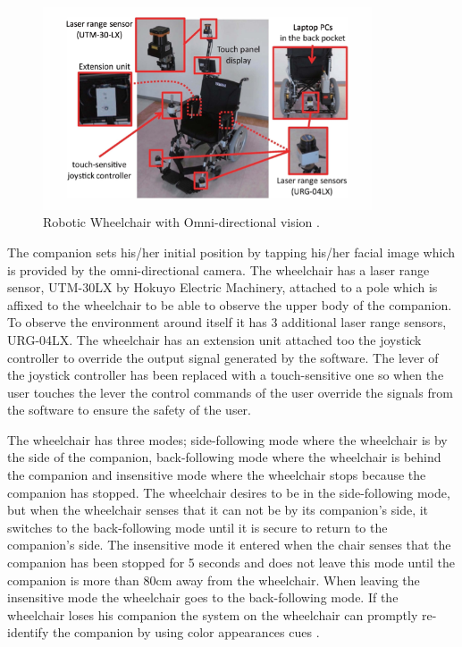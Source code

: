 \begin{figure}[!ht]
    \centering
    \includegraphics[height=60mm]{graphics/omni-vision wheelchair.png}
    \caption{Robotic Wheelchair with Omni-directional vision \cite{kobayashi_robotic_2012}.}
    \label{fig:omni-chair}
\end{figure}

The companion sets his/her initial position by tapping his/her facial image which is provided by the omni-directional camera.
The wheelchair has a laser range sensor, UTM-30LX by Hokuyo Electric Machinery, attached to a pole which is affixed to the wheelchair to be able to observe the upper body of the companion.
To observe the environment around itself it has 3 additional laser range sensors, URG-04LX. 
The wheelchair has an extension unit attached too the joystick controller to override the output signal generated by the software.
The lever of the joystick controller has been replaced with a touch-sensitive one so when the user touches the lever the control commands of the user override the signals from the software to ensure the safety of the user.

The wheelchair has three modes; side-following mode where the wheelchair is by the side of the companion, back-following mode where the wheelchair is behind the companion and insensitive mode where the wheelchair stops because the companion has stopped. 
The wheelchair desires to be in the side-following mode, but when the wheelchair senses that it can not be by its companion's side, it switches to the back-following mode until it is secure to return to the companion's side. 
The insensitive mode it entered when the chair senses that the companion has been stopped for 5 seconds and does not leave this mode until the companion is more than 80cm away from the wheelchair.
When leaving the insensitive mode the wheelchair goes to the back-following mode.
If the wheelchair loses his companion the system on the wheelchair can promptly re-identify the companion by using color appearances cues \cite{kobayashi_robotic_2012}.



